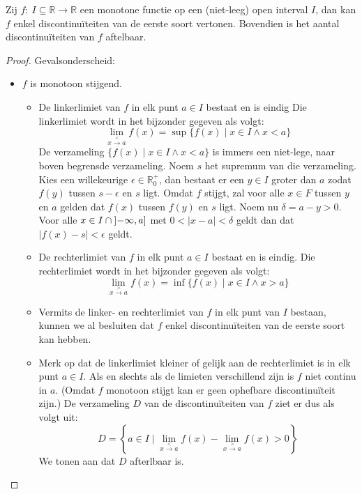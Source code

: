 \documentclass[main.tex]{subfiles}
\begin{document}
\begin{bpr}
  Zij $f:\ I \subseteq \mathbb{R} \rightarrow \mathbb{R}$ een monotone functie op een (niet-leeg) open interval $I$, dan kan $f$ enkel discontinu\"iteiten van de eerste soort vertonen.
  Bovendien is het aantal discontinu\"iteiten van $f$ aftelbaar.

  \begin{proof}
    Gevalsonderscheid:
    \begin{itemize}
    \item $f$ is monotoon stijgend.
      \begin{itemize}
      \item De linkerlimiet van $f$ in elk punt $a\in I$ bestaat en is eindig
        Die linkerlimiet wordt in het bijzonder gegeven als volgt:
        \[ \lim_{x \overset{<}{\rightarrow} a}f(x) = \sup\{ f(x)\mid x\in I \wedge x < a \} \]
        De verzameling $\{ f(x)\mid x\in I \wedge x < a \}$ is immers een niet-lege, naar boven begrensde verzameling.
        Noem $s$ het supremum van die verzameling.
        Kies een willekeurige $\epsilon \in \mathbb{R}_{0}^{+}$, dan
        bestaat er een $y\in I$ groter dan $a$ zodat $f(y)$ tussen
        $s-\epsilon$ en $s$ ligt.  Omdat $f$ stijgt, zal voor alle
        $x\in F$ tussen $y$ en $a$ gelden dat $f(x)$ tussen $f(y)$ en
        $s$ ligt.  Noem nu $\delta = a-y > 0$.  Voor alle
        $x\in I\cap\interval[open left]{-\infty}{a}$ met
        $0<|x-a|<\delta$ geldt dan dat $|f(x)-s|<\epsilon$ geldt.
      \item De rechterlimiet van $f$ in elk punt $a\in I$ bestaat en is eindig.
        Die rechterlimiet wordt in het bijzonder gegeven als volgt:
        \[ \lim_{x \overset{>}{\rightarrow} a}f(x) = \inf\{ f(x)\mid x\in I \wedge x > a \} \]
      \item Vermits de linker- en rechterlimiet van $f$ in elk punt van $I$ bestaan, kunnen we al besluiten dat $f$ enkel discontinu\"iteiten van de eerste soort kan hebben.
      \item Merk op dat de linkerlimiet kleiner of gelijk aan de rechterlimiet is in elk punt $a\in I$.
        Als en slechts als de limieten verschillend zijn is $f$ niet continu in $a$.
        (Omdat $f$ monotoon stijgt kan er geen ophefbare discontinu\"iteit zijn.)
        De verzameling $D$ van de discontinu\"iteiten van $f$ ziet er dus als volgt uit:
        \[ D = \left\{ a \in I \mid \lim_{x \overset{<}{\rightarrow} a}f(x)- \lim_{x \overset{>}{\rightarrow} a}f(x) > 0 \right\} \]
        We tonen aan dat $D$ afterlbaar is.\\

\end{itemize}
\end{itemize}
\end{proof}
\end{bpr}
\end{document}
